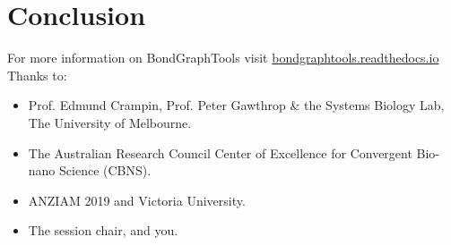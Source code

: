\documentclass[11pt,reqno]{beamer}
\begin{document}
\section{Conclusion}
\begin{frame}
For more information on BondGraphTools visit \url{bondgraphtools.readthedocs.io}
\vfill
Thanks to:
\begin{itemize}
	\item Prof. Edmund Crampin, Prof. Peter Gawthrop \& the Systems Biology Lab, The University of Melbourne.
	\item The Australian Research Council Center of Excellence for Convergent Bio-nano Science (CBNS).
	\item ANZIAM 2019 and Victoria University.
	\item The session chair, and you.
\end{itemize}


\end{frame}
\begin{frame}[allowframebreaks]
\tiny
\printbibliography
\end{frame}
\end{document}
